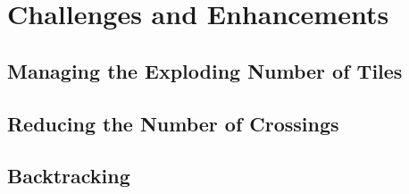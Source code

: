 \documentclass[../../main.tex]{subfiles}
\begin{document}
\section{Challenges and Enhancements}

\subsection{Managing the Exploding Number of Tiles}
\subsection{Reducing the Number of Crossings}
\subsection{Backtracking}
\end{document}
